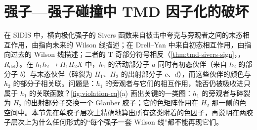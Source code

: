 \section{强子—强子碰撞中 TMD 因子化的破坏}\label{sec:break-tmd}

在 SIDIS 中，横向极化强子的 Sivers 函数来自被击中夸克与旁观者之间的末态相互作用，由指向未来的 Wilson 线描述；在 Drell--Yan 中来自初态相互作用，由指向过去的 Wilson 线描述；二者的 T 奇部分符号相反（\cref{thm:tmd-sivers-sign}，\tagR，$R_{\mathrm{def}}$）。在 $h_1h_2\to H_1H_2X$ 中，$h_1$ 的活动部分子 $a$ 同时有初态伙伴（来自 $h_2$ 的部分子 $b$）与末态伙伴（碎裂为 $H_1$、$H_2$ 的出射部分子 $c$、$d$），而这些伙伴的颜色与 $h_2$ 的部分子相关联。问题是：$h_1$ 的旁观者与它们的相互作用，能否仍被吸收进只属于 $h_1$ 的关联函数？\cref{fig:violation-cq}(a) 画出关键的一类图：$h_1$ 的旁观者与碎裂为 $H_2$ 的出射部分子交换一个 Glauber 胶子；它的色矩阵作用在 $H_2$ 那一侧的色空间中。本节先在单胶子层次上精确地算出所有这类附着的色因子，再说明在两胶子层次上为什么任何形式的“每个强子一套 Wilson 线”都不能再现它们。

